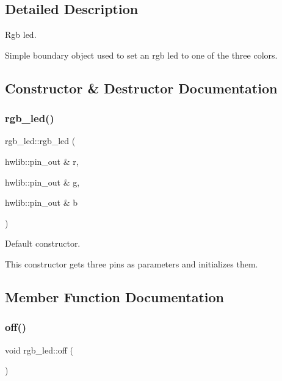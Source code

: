 \subsection{Detailed Description}
Rgb led. 

Simple boundary object used to set an rgb led to one of the three colors. 

\subsection{Constructor \& Destructor Documentation}
\hypertarget{classrgb__led_ab8a4367c1d76a6274e65230524af0456}{}\label{classrgb__led_ab8a4367c1d76a6274e65230524af0456} 
\subsubsection{\texorpdfstring{rgb\+\_\+led()}{rgb\_led()}}
{\footnotesize\ttfamily rgb\+\_\+led\+::rgb\+\_\+led (\begin{DoxyParamCaption}\item[{hwlib\+::pin\+\_\+out \&}]{r,  }\item[{hwlib\+::pin\+\_\+out \&}]{g,  }\item[{hwlib\+::pin\+\_\+out \&}]{b }\end{DoxyParamCaption})\hspace{0.3cm}{\ttfamily [inline]}}



Default constructor. 

This constructor gets three pins as parameters and initializes them. 

\subsection{Member Function Documentation}
\hypertarget{classrgb__led_ab22d036c95b9eaa96cd73ec33758a4f0}{}\label{classrgb__led_ab22d036c95b9eaa96cd73ec33758a4f0} 
\subsubsection{\texorpdfstring{off()}{off()}}
{\footnotesize\ttfamily void rgb\+\_\+led\+::off (\begin{DoxyParamCaption}{ }\end{DoxyParamCaption})\hspace{0.3cm}{\ttfamily [inline]}}



